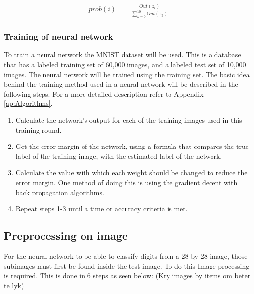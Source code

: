 \begin{align}
  prob(i) =  &\displaystyle{\frac{Out(z_{i})}{\sum_{k=0}^{10} Out(z_{k})}}
\label{eqn:normal}
\end{align}

\subsubsection{Training of neural network}
\label{sec:trainNN}

To train a neural network the MNIST dataset will be used. This is a database that has a labeled training set of 60,000 images, and a labeled test set of 10,000 images. The neural network will be trained using the training set. The basic idea behind the training method used in a neural network will be described in the following steps. For a more detailed description refer to Appendix \ref{ap:Algorithms}.

\begin{enumerate}
\item Calculate the network's output for each of the training images used in this training round.
\item Get the error margin of the network, using a formula that compares the true label of the training image, with the estimated label of the network.
\item Calculate the value with which each weight should be changed to reduce the error margin. One method of doing this is using the gradient decent with back propagation algorithms.
\item Repeat steps 1-3 until a time or accuracy criteria is met.
\end{enumerate}


\subsection{Preprocessing on image}
\label{sec:preprocess}

For the neural network to be able to classify digits from a 28 by 28 image, those subimages must first be found inside the test image. To do this Image processing is required. This is done in 6 steps as seen below: (Kry images by items om beter te lyk)

